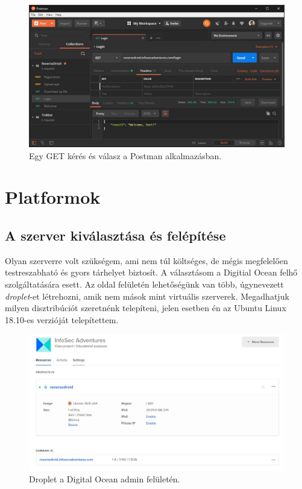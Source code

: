 \documentclass{thesis-ekf}
\theoremstyle{definition}
\theoremstyle{remark}
\begin{document}
\begin{figure}[!h]
	\centering
	\includegraphics[width=15cm]{pictures/postman}
	\caption{Egy GET kérés és válasz a Postman alkalmazásban.}
	\label{postman}
\end{figure}



\chapter{Platformok}\label{platformok}

\section{A szerver kiválasztása és felépítése}

Olyan szerverre volt szükségem, ami nem túl költséges, de mégis megfelelően testreszabható és gyors tárhelyet biztosít.
A választásom a Digitial Ocean felhő szolgáltatására esett. Az oldal felületén lehetőségünk van több, úgynevezett \emph{droplet}-et létrehozni, amik nem mások mint virtuális szerverek. 
Megadhatjuk milyen disztribúciót szeretnénk telepíteni, jelen esetben én az Ubuntu Linux 18.10-es verzióját telepítettem.

\begin{figure}[!h]
	\centering
	\includegraphics[width=15cm]{pictures/digitalocean}
	\caption{Droplet a Digital Ocean admin felületén.}
	\label{digitalocean}
\end{figure}
\end{document}
